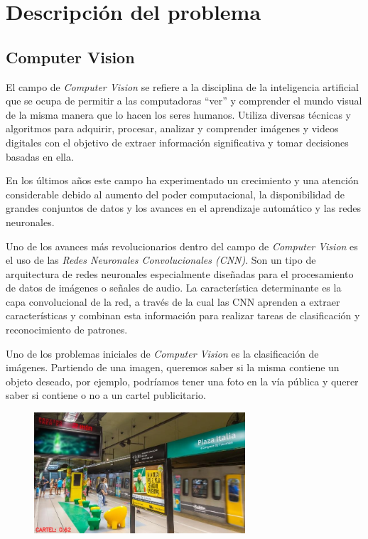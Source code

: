 \documentclass[a4paper]{article}
\begin{document}
\section{Descripción del problema}
\subsection{Computer Vision}
El campo de \emph{Computer Vision} se refiere a la disciplina de la inteligencia artificial que se ocupa de permitir a las computadoras ``ver'' y comprender el mundo visual de la misma manera que lo hacen los seres humanos. Utiliza diversas técnicas y algoritmos para adquirir, procesar, analizar y comprender imágenes y videos digitales con el objetivo de extraer información significativa y tomar decisiones basadas en ella.

En los últimos años este campo ha experimentado un crecimiento y una atención considerable debido al aumento del poder computacional, la disponibilidad de grandes conjuntos de datos y los avances en el aprendizaje automático y las redes neuronales.

Uno de los avances más revolucionarios dentro del campo de \emph{Computer Vision} es el uso de las \emph{Redes Neuronales Convolucionales (CNN)}. Son un tipo de arquitectura de redes neuronales especialmente diseñadas para el procesamiento de datos de imágenes o señales de audio. La característica determinante es la capa convolucional de la red, a través de la cual las CNN aprenden a extraer características y combinan esta información para realizar tareas de clasificación y reconocimiento de patrones.

Uno de los problemas iniciales de \emph{Computer Vision} es la clasificación de imágenes. Partiendo de una imagen, queremos saber si la misma contiene un objeto deseado, por ejemplo, podríamos tener una foto en la vía pública y querer saber si contiene o no a un cartel publicitario.

\begin{figure}[H]
    \includegraphics[width=0.7\textwidth]{./img/classif.jpg}
    \centering
\end{figure}
\end{document}
